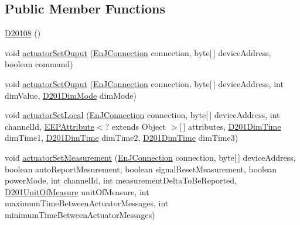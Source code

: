 \subsection*{Public Member Functions}
\begin{DoxyCompactItemize}
\item 
\hyperlink{classit_1_1polito_1_1elite_1_1enocean_1_1enj_1_1eep_1_1eep26_1_1_d2_1_1_d201_1_1_d20108_a07bc2cea9684381e8351232f4f6526f2}{D20108} ()
\item 
void \hyperlink{classit_1_1polito_1_1elite_1_1enocean_1_1enj_1_1eep_1_1eep26_1_1_d2_1_1_d201_1_1_d20108_a9c75e41d6232a6cfd6ce81e1e50e5168}{actuator\+Set\+Ouput} (\hyperlink{classit_1_1polito_1_1elite_1_1enocean_1_1enj_1_1communication_1_1_en_j_connection}{En\+J\+Connection} connection, byte\mbox{[}$\,$\mbox{]} device\+Address, boolean command)
\item 
void \hyperlink{classit_1_1polito_1_1elite_1_1enocean_1_1enj_1_1eep_1_1eep26_1_1_d2_1_1_d201_1_1_d20108_a4f36df87662c08a006f12b9e7ffd454f}{actuator\+Set\+Ouput} (\hyperlink{classit_1_1polito_1_1elite_1_1enocean_1_1enj_1_1communication_1_1_en_j_connection}{En\+J\+Connection} connection, byte\mbox{[}$\,$\mbox{]} device\+Address, int dim\+Value, \hyperlink{enumit_1_1polito_1_1elite_1_1enocean_1_1enj_1_1eep_1_1eep26_1_1_d2_1_1_d201_1_1_d201_dim_mode}{D201\+Dim\+Mode} dim\+Mode)
\item 
void \hyperlink{classit_1_1polito_1_1elite_1_1enocean_1_1enj_1_1eep_1_1eep26_1_1_d2_1_1_d201_1_1_d20108_a40a39654e2487beb2065acfd00a44b48}{actuator\+Set\+Local} (\hyperlink{classit_1_1polito_1_1elite_1_1enocean_1_1enj_1_1communication_1_1_en_j_connection}{En\+J\+Connection} connection, byte\mbox{[}$\,$\mbox{]} device\+Address, int channel\+Id, \hyperlink{classit_1_1polito_1_1elite_1_1enocean_1_1enj_1_1eep_1_1_e_e_p_attribute}{E\+E\+P\+Attribute}$<$? extends Object $>$\mbox{[}$\,$\mbox{]} attributes, \hyperlink{enumit_1_1polito_1_1elite_1_1enocean_1_1enj_1_1eep_1_1eep26_1_1_d2_1_1_d201_1_1_d201_dim_time}{D201\+Dim\+Time} dim\+Time1, \hyperlink{enumit_1_1polito_1_1elite_1_1enocean_1_1enj_1_1eep_1_1eep26_1_1_d2_1_1_d201_1_1_d201_dim_time}{D201\+Dim\+Time} dim\+Time2, \hyperlink{enumit_1_1polito_1_1elite_1_1enocean_1_1enj_1_1eep_1_1eep26_1_1_d2_1_1_d201_1_1_d201_dim_time}{D201\+Dim\+Time} dim\+Time3)
\item 
void \hyperlink{classit_1_1polito_1_1elite_1_1enocean_1_1enj_1_1eep_1_1eep26_1_1_d2_1_1_d201_1_1_d20108_a7f81035e7d50486dfc7c33553227f1c5}{actuator\+Set\+Measurement} (\hyperlink{classit_1_1polito_1_1elite_1_1enocean_1_1enj_1_1communication_1_1_en_j_connection}{En\+J\+Connection} connection, byte\mbox{[}$\,$\mbox{]} device\+Address, boolean auto\+Report\+Mesurement, boolean signal\+Reset\+Measurement, boolean power\+Mode, int channel\+Id, int measurement\+Delta\+To\+Be\+Reported, \hyperlink{enumit_1_1polito_1_1elite_1_1enocean_1_1enj_1_1eep_1_1eep26_1_1_d2_1_1_d201_1_1_d201_unit_of_measure}{D201\+Unit\+Of\+Measure} unit\+Of\+Measure, int maximum\+Time\+Between\+Actuator\+Messages, int minimum\+Time\+Between\+Actuator\+Messages)

\end{DoxyCompactItemize}
